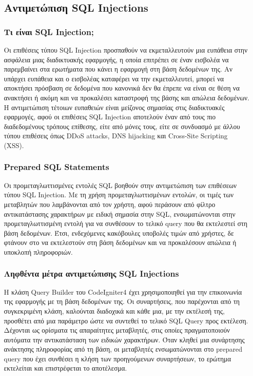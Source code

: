 \subsection{Αντιμετώπιση SQL Injections}
\subsubsection{Τι είναι SQL Injection;}
Οι επιθέσεις τύπου SQL Injection προσπαθούν να εκμεταλλευτούν μια ευπάθεια στην ασφάλεια μιας διαδικτυακής εφαρμογής, η οποία επιτρέπει σε έναν εισβολέα να παρεμβαίνει στα ερωτήματα που κάνει η εφαρμογή στη βάση δεδομένων της. Αν υπάρχει ευπάθεια και ο εισβολέας καταφέρει να την εκμεταλλευτεί, μπορεί να αποκτήσει πρόσβαση σε δεδομένα που κανονικά δεν θα έπρεπε να είναι σε θέση να ανακτήσει ή ακόμη και να προκαλέσει καταστροφή της βάσης και απώλεια δεδομένων. Η αντιμετώπιση τέτοιων ευπαθειών είναι μείζονος σημασίας στις διαδικτυακές εφαρμογές, αφού οι επιθέσεις SQL Injection αποτελούν έναν από τους πιο διαδεδομένους τρόπους επίθεσης, είτε από μόνες τους, είτε σε συνδυασμό με άλλου τύπου επιθέσεις όπως DDoS attacks, DNS hijacking και Cross-Site Scripting (XSS).

\subsubsection{Prepared SQL Statements}
Οι προμεταγλωττισμένες εντολές SQL βοηθούν στην αντιμετώπιση των επιθέσεων τύπου SQL Injection. Με τη χρήση προμεταγλωττισμένων εντολών, οι τιμές των μεταβλητών που λαμβάνονται από τον χρήστη, αφού περάσουν από φίλτρο αντικατάστασης χαρακτήρων με ειδική σημασία στην SQL, ενσωματώνονται στην προμεταγλωττισμένη εντολή για να συνθέσουν το τελικό query που θα εκτελεστεί στη βάση δεδομένων. Έτσι, ενδεχόμενες κακόβουλες υποβολές τιμών από χρήστες, δε φτάνουν στο να εκτελεστούν στη βάση δεδομένων και να προκαλέσουν απώλεια ή υποκλοπή πληροφοριών.

\subsubsection{Ληφθέντα μέτρα αντιμετώπισης SQL Injections}
Η κλάση Query Builder του CodeIgniter4 \cite{CodeIgniter_querybuilder} έχει χρησιμοποιηθεί για την επικοινωνία της εφαρμογής με τη βάση δεδομένων της. Οι συναρτήσεις, που παρέχονται από τη συγκεκριμένη κλάση, καλούνται διαδοχικά και κάθε μια, με την εκτέλεσή της, προσθέτει από μια παράμετρο ώστε να συντεθεί το τελικό SQL Query προς εκτέλεση. Δέχονται ως ορίσματα τις απαραίτητες μεταβλητές, στις οποίες πραγματοποιούν αυτόματα την αντικατάσταση των ειδικών χαρακτήρων. Όταν κληθεί μια συνάρτησης ανάκτησης πληροφορίας από τη βάση, οι μεταβλητές ενσωματώνονται στο prepared query που έχει συνθέσει η κλήση των προηγούμενων συναρτήσεων, το ερώτημα εκτελείται και επιστρέφεται το αποτέλεσμα.

